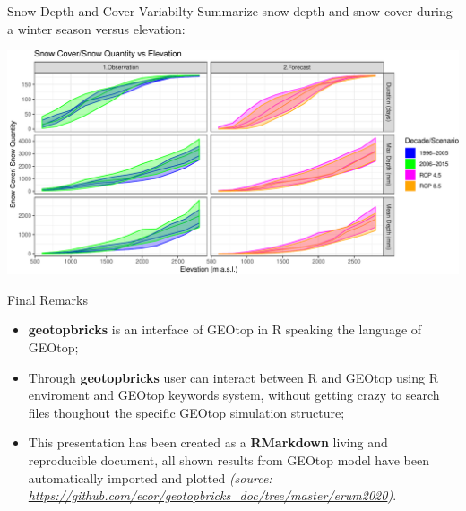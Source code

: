 \documentclass[
  ignorenonframetext,
]{beamer}
\providecommand{\tightlist}{%
  \setlength{\itemsep}{0pt}\setlength{\parskip}{0pt}}
\begin{document}
\begin{frame}{Snow Depth and Cover Variabilty}
\protect\hypertarget{snow-depth-and-cover-variabilty}{}
Summarize snow depth and snow cover during a winter season versus
elevation:

\begin{center}\includegraphics[width=0.9\linewidth]{cordanoe_geotopbricks_presenetation_files/figure-beamer/snow-altitude-1} \end{center}
\end{frame}

\begin{frame}{Final Remarks}
\protect\hypertarget{final-remarks}{}
\begin{itemize}
\item
  \textbf{geotopbricks} is an interface of GEOtop in R speaking the
  language of GEOtop;
\item
  Through \textbf{geotopbricks} user can interact between R and GEOtop
  using R enviroment and GEOtop keywords system, without getting crazy
  to search files thoughout the specific GEOtop simulation structure;
\end{itemize}

\begin{itemize}
\tightlist
\item
  This presentation has been created as a \textbf{RMarkdown} living and
  reproducible document, all shown results from GEOtop model have been
  automatically imported and plotted \emph{(source:
  \url{https://github.com/ecor/geotopbricks_doc/tree/master/erum2020})}.
\end{itemize}
\end{frame}
\end{document}
